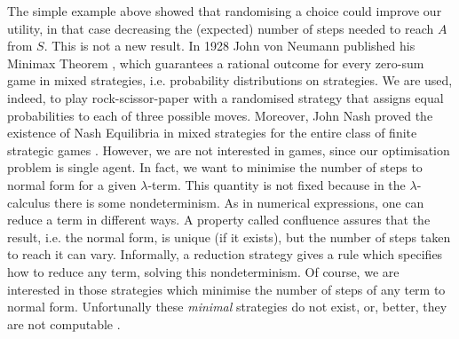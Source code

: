The simple example above showed that randomising a choice could improve our utility, in that case decreasing the (expected) number of steps needed to reach $A$ from $S$. This is not a new result. In 1928 John von Neumann published his Minimax Theorem \cite{}, which guarantees a rational outcome for every zero-sum game in mixed strategies, i.e. probability distributions on strategies. We are used, indeed, to play rock-scissor-paper with a randomised strategy that assigns equal probabilities to each of three possible moves. Moreover, John Nash proved the existence of Nash Equilibria in mixed strategies for the entire class of finite strategic games \cite{}. However, we are not interested in games, since our optimisation problem is single agent. In fact, we want to minimise the number of steps to normal form for a given $\lambda$-term. This quantity is not fixed because in the $\lambda$-calculus there is some nondeterminism. As in numerical expressions, one can reduce a term in different ways. A property called confluence assures that the result, i.e. the normal form, is unique (if it exists), but the number of steps taken to reach it can vary. Informally, a reduction strategy gives a rule which specifies how to reduce any term, solving this nondeterminism. Of course, we are interested in those strategies which minimise the number of steps of any term to normal form. Unfortunally these \emph{minimal} strategies do not exist, or, better, they are not computable \cite{barendregt_lambda_1984}.

